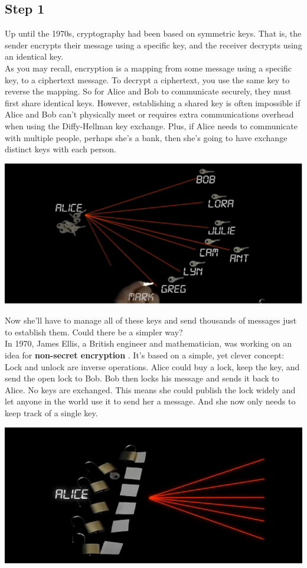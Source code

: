 \documentclass{report}
\begin{document}
\subsection{Step 1}
Up until the 1970s, cryptography had been based on symmetric keys. That is, the sender encrypts their message using a specific key, and the receiver decrypts using an identical key. \\
As you may recall, encryption is a mapping from some message using a specific key, to a ciphertext message. To decrypt a ciphertext, you use the same key to reverse the mapping. So for Alice and Bob to communicate securely, they must first share identical keys. However, establishing a shared key is often impossible if Alice and Bob can't physically meet or requires extra communications overhead when using the Diffy-Hellman key exchange. Plus, if Alice needs to communicate with multiple people, perhaps she's a bank, then she's going to have exchange distinct keys with each person. 
\begin{center}
	\includegraphics[scale=1]{28.png}
\end{center}
Now she'll have to manage all of these keys and send thousands of messages just to establish them. Could there be a simpler way? \\
In 1970, James Ellis, a British engineer and mathematician, was working on an idea for \textbf{non-secret encryption} . It's based on a simple, yet clever concept: Lock and unlock are inverse operations. Alice could buy a lock, keep the key, and send the open lock to Bob. Bob then locks his message and sends it back to Alice. No keys are exchanged. This means she could publish the lock widely and let anyone in the world use it to send her a message. And she now only needs to keep track of a single key.
\begin{center}
	\includegraphics[scale=1]{29.png}
\end{center}
\end{document}
